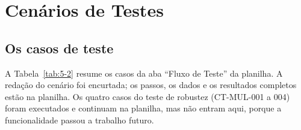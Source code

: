 
\section{Cenários de Testes}\label{sec:5-2}

\subsection{Os casos de teste}\label{sec:5-2-1}

A Tabela~\ref{tab:5-2} resume os casos da aba ``Fluxo de Teste'' da planilha. A redação do cenário foi encurtada; os passos, os dados e os resultados completos estão na planilha. Os quatro casos do teste de robustez (CT-MUL-001 a 004) foram executados e continuam na planilha, mas não entram aqui, porque a funcionalidade passou a trabalho futuro.


